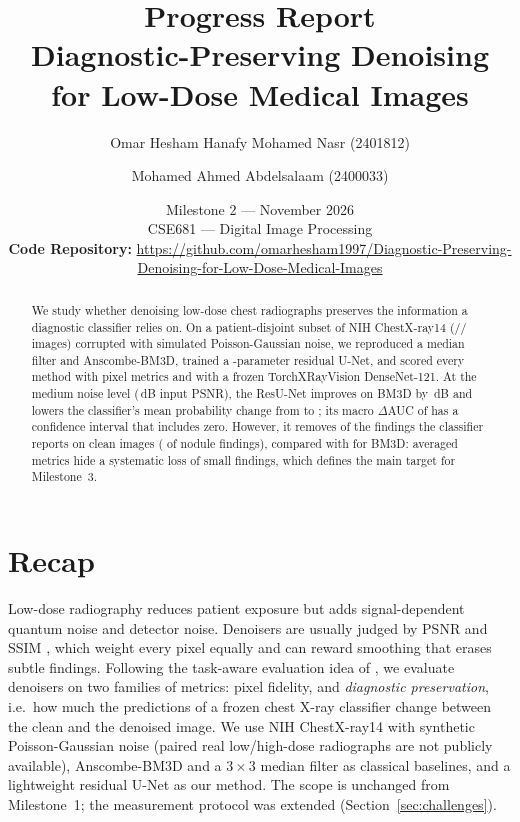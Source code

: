 \documentclass[11pt]{article}
\title{\LARGE Progress Report \\[4pt]
\large Diagnostic-Preserving Denoising for Low-Dose Medical Images}
\author{
  Omar Hesham Hanafy Mohamed Nasr (2401812) \and
  Mohamed Ahmed Abdelsalaam (2400033)
}
\date{Milestone 2 --- November 2026 \\{} CSE681 --- Digital Image Processing \\[6pt]
\normalsize \textbf{Code Repository:} \url{https://github.com/omarhesham1997/Diagnostic-Preserving-Denoising-for-Low-Dose-Medical-Images}}
\begin{document}
\maketitle

\begin{abstract}
We study whether denoising low-dose chest radiographs preserves the information a diagnostic classifier relies on. On a patient-disjoint subset of NIH ChestX-ray14 (\NTrain/\NVal/\NTest{} images) corrupted with simulated Poisson-Gaussian noise, we reproduced a median filter and Anscombe-BM3D, trained a \Params-parameter residual U-Net, and scored every method with pixel metrics and with a frozen TorchXRayVision DenseNet-121. At the medium noise level (\NoiseMediumPSNR\,dB input PSNR), the ResU-Net improves on BM3D by \CmpPSNR\,dB and lowers the classifier's mean probability change from \BMDp{} to \OursDp; its macro $\Delta$AUC of \OursDAUC{} \OursDAUCci{} has a confidence interval that includes zero. However, it removes \OursLost{} of the findings the classifier reports on clean images (\OursLostNodule{} of nodule findings), compared with \BMLost{} for BM3D: averaged metrics hide a systematic loss of small findings, which defines the main target for Milestone~3.
\end{abstract}

\section{Recap}
\label{sec:recap}
Low-dose radiography reduces patient exposure but adds signal-dependent quantum noise and detector noise. Denoisers are usually judged by PSNR and SSIM \citep{wang2004ssim}, which weight every pixel equally and can reward smoothing that erases subtle findings. Following the task-aware evaluation idea of \citet{dai2025compression}, we evaluate denoisers on two families of metrics: pixel fidelity, and \emph{diagnostic preservation}, i.e.\ how much the predictions of a frozen chest X-ray classifier \citep{cohen2022torchxrayvision} change between the clean and the denoised image. We use NIH ChestX-ray14 \citep{wang2017chestxray8} with synthetic Poisson-Gaussian noise (paired real low/high-dose radiographs are not publicly available), Anscombe-BM3D \citep{dabov2007bm3d,makitalo2013gat} and a $3\times3$ median filter as classical baselines, and a lightweight residual U-Net \citep{ronneberger2015unet,zhang2017dncnn} as our method. The scope is unchanged from Milestone~1; the measurement protocol was extended (Section~\ref{sec:challenges}).
\end{document}
